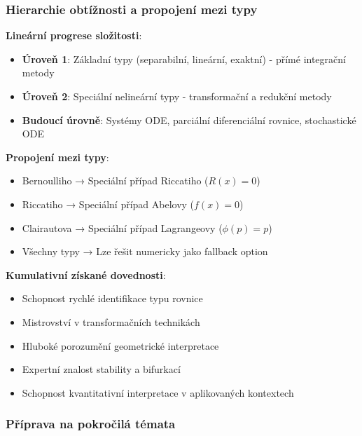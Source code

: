 \subsubsection{Hierarchie obtížnosti a propojení mezi typy}
\label{subsec:hierarchie-uroven2}

\noindent\textbf{Lineární progrese složitosti}:
\begin{itemize}
\item \textbf{Úroveň 1}: Základní typy (separabilní, lineární, exaktní) - přímé integrační metody
\item \textbf{Úroveň 2}: Speciální nelineární typy - transformační a redukční metody
\item \textbf{Budoucí úrovně}: Systémy ODE, parciální diferenciální rovnice, stochastické ODE
\end{itemize}

\vspace{1\baselineskip}

\noindent\textbf{Propojení mezi typy}:
\begin{itemize}
\item Bernoulliho → Speciální případ Riccatiho ($R(x) = 0$)
\item Riccatiho → Speciální případ Abelovy ($f(x) = 0$)
\item Clairautova → Speciální případ Lagrangeovy ($\phi(p) = p$)
\item Všechny typy → Lze řešit numericky jako fallback option
\end{itemize}

\vspace{1\baselineskip}

\noindent\textbf{Kumulativní získané dovednosti}:
\begin{itemize}
\item Schopnost rychlé identifikace typu rovnice
\item Mistrovství v transformačních technikách
\item Hluboké porozumění geometrické interpretace
\item Expertní znalost stability a bifurkací
\item Schopnost kvantitativní interpretace v aplikovaných kontextech
\end{itemize}

\subsubsection{Příprava na pokročilá témata}
\label{subsec:priprava-uroven2}

